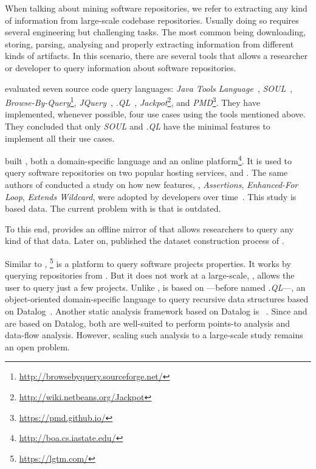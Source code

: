 When talking about mining software repositories,
we refer to extracting any kind of information from large-scale codebase repositories. 
Usually doing so requires several engineering but challenging tasks.
The most common being downloading, storing, parsing, analysing and
properly extracting information from different kinds of artifacts.
In this scenario, there are several tools that allows a researcher or developer to query information about software repositories.

\cite{urmaProgrammingLanguageEvolution2012} evaluated seven source code
query languages:
\emph{Java Tools Language}~\citep{cohenJTLJavaTools},
\emph{SOUL}~\citep{derooverSOULToolSuite2011},
\emph{Browse-By-Query}\footnote{\url{http://browsebyquery.sourceforge.net/}},
\emph{JQuery}~\citep{volderJqueryGenericCode2006},
\emph{.QL}~\citep{moorKeynoteAddressQL2007},
\emph{Jackpot}\footnote{\url{http://wiki.netbeans.org/Jackpot}}, and
\emph{PMD}\footnote{\url{https://pmd.github.io/}}.
They have implemented, whenever possible,
four use cases using the tools mentioned above.
They concluded that only \emph{SOUL} and \emph{.QL} have the minimal features to implement all their use cases.

\cite{dyerBoaLanguageInfrastructure2013,dyerDeclarativeVisitorsEase2013} built \boa{}, both a domain-specific language and an online platform\footnote{\url{http://boa.cs.iastate.edu/}}. 
It is used to query software repositories on two popular hosting services, \github{} and \sourceforge{}.
The same authors of \boa{} conducted a study on
how new \java{} features, \eg,
\emph{Assertions},
\emph{Enhanced-For Loop},
\emph{Extends Wildcard},
were adopted by developers over time~\citep{dyerMiningBillionsAST2014}.
This study is based \sourceforge{} data.
The current problem with \sourceforge{} is that is outdated.

To this end, \cite{gousiosGHTorentDatasetTool2013} provides an offline mirror of \github{} that allows researchers to query any kind of that data.
Later on, \cite{gousiosLeanGHTorrentGitHub2014} published the dataset construction process of \github{}.

Similar to \boa{}, \lgtm{}\footnote{\url{https://lgtm.com/}} is a platform to query software projects properties.
It works by querying repositories from \github{}.
But it does not work at a large-scale, \ie{}, \lgtm{} allows the user to query just a few projects.
Unlike \boa{}, \lgtm{} is based on \ql{}---before named \emph{.QL}---,
an object-oriented domain-specific language to query recursive data structures based on Datalog~\citep{avgustinovQLObjectorientedQueries2016}.
Another static analysis framework based on Datalog is \doop{}~\citep{bravenboerStrictlyDeclarativeSpecification}.
Since \ql{} and \doop{} are based on Datalog,
both are well-suited to perform points-to analysis and data-flow analysis.
However, scaling such analysis to a large-scale study remains an open problem.

